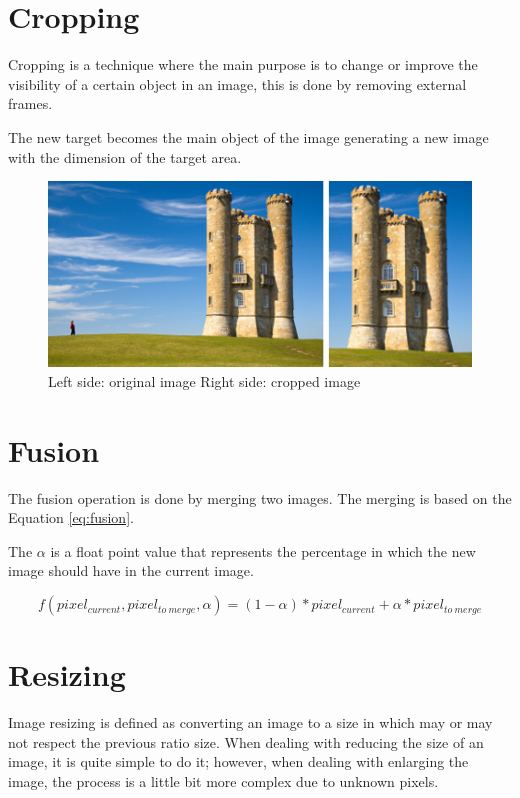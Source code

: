 \documentclass{article}
\begin{document}
\section{Cropping}

	Cropping is a technique where the main purpose is to change or improve the visibility of a certain object in an image, 
	this is done by removing external frames. 

	The new target becomes the main object of the image generating a new image with the dimension of the target area.  

	\begin{figure}[H]
	\centering
	\includegraphics[scale=2]{images/crop}
	\caption{Left side: original image Right side: cropped image}
	\label{fig:cropping}
	\end{figure}


\section{Fusion}

	The fusion operation is done by merging two images. The merging is based on the Equation \ref{eq:fusion}. 
	
	The $\alpha$ is a float point value that represents the percentage in which the new image should have in the current image. 

	\begin{equation}
		f(pixel_{current},pixel_{to\ merge},\alpha)=(1-\alpha)*pixel_{current}+\alpha*pixel_{to\ merge}
		\label{eq:fusion}
	\end{equation}

\section{Resizing}

	Image resizing is defined as converting an image to a size in which may or may not respect the previous ratio size.
	When dealing with reducing the size of an image, it is quite simple to do it; however, when dealing with enlarging 
	the image, the process is a little bit more complex due to unknown pixels.
\end{document}
